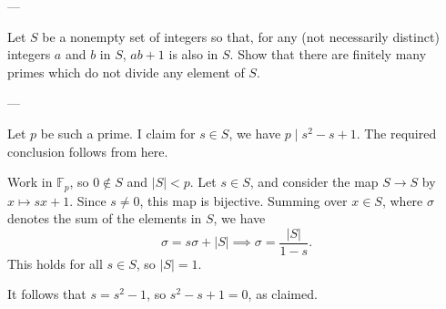 
---

Let $S$ be a nonempty set of integers so that, for any (not necessarily distinct) integers $a$ and $b$ in $S$, $ab+1$ is also in $S$. Show that there are finitely many primes which do not divide any element of $S$.

---

Let $p$ be such a prime. I claim for $s\in S$, we have $p\mid s^2-s+1$. The required conclusion follows from here.

Work in $\mathbb F_p$, so $0\notin S$ and $|S|<p$. Let $s\in S$, and consider the map $S\to S$ by $x\mapsto sx+1$. Since $s\ne0$, this map is bijective. Summing over $x\in S$, where $\sigma$ denotes the sum of the elements in $S$, we have \[\sigma=s\sigma+|S|\implies \sigma=\frac{|S|}{1-s}.\]
This holds for all $s\in S$, so $|S|=1$.

It follows that $s=s^2-1$, so $s^2-s+1=0$, as claimed.


